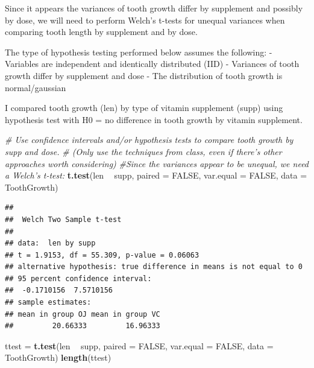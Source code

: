 \documentclass[]{article}
\newenvironment{Shaded}{\begin{snugshade}}{\end{snugshade}}
\newcommand{\KeywordTok}[1]{\textcolor[rgb]{0.13,0.29,0.53}{\textbf{#1}}}
\newcommand{\DataTypeTok}[1]{\textcolor[rgb]{0.13,0.29,0.53}{#1}}
\newcommand{\StringTok}[1]{\textcolor[rgb]{0.31,0.60,0.02}{#1}}
\newcommand{\CommentTok}[1]{\textcolor[rgb]{0.56,0.35,0.01}{\textit{#1}}}
\newcommand{\OtherTok}[1]{\textcolor[rgb]{0.56,0.35,0.01}{#1}}
\newcommand{\OperatorTok}[1]{\textcolor[rgb]{0.81,0.36,0.00}{\textbf{#1}}}
\newcommand{\NormalTok}[1]{#1}
\begin{document}
Since it appears the variances of tooth growth differ by supplement and
possibly by dose, we will need to perform Welch's t-tests for unequal
variances when comparing tooth length by supplement and by dose.

The type of hypothesis testing performed below assumes the following: -
Variables are independent and identically distributed (IID) - Variances
of tooth growth differ by supplement and dose - The distribution of
tooth growth is normal/gaussian

I compared tooth growth (len) by type of vitamin supplement (supp) using
hypothesis test with H0 = no difference in tooth growth by vitamin
supplement.

\begin{Shaded}
\begin{Highlighting}[]
\CommentTok{# Use confidence intervals and/or hypothesis tests to compare tooth growth by supp and dose. }
\CommentTok{# (Only use the techniques from class, even if there's other approaches worth considering)}
        \CommentTok{#Since the variances appear to be unequal, we need a Welch's t-test:}
        \KeywordTok{t.test}\NormalTok{(len }\OperatorTok{~}\StringTok{ }\NormalTok{supp, }\DataTypeTok{paired =} \OtherTok{FALSE}\NormalTok{, }\DataTypeTok{var.equal =} \OtherTok{FALSE}\NormalTok{, }\DataTypeTok{data =}\NormalTok{ ToothGrowth)}
\end{Highlighting}
\end{Shaded}

\begin{verbatim}
## 
##  Welch Two Sample t-test
## 
## data:  len by supp
## t = 1.9153, df = 55.309, p-value = 0.06063
## alternative hypothesis: true difference in means is not equal to 0
## 95 percent confidence interval:
##  -0.1710156  7.5710156
## sample estimates:
## mean in group OJ mean in group VC 
##         20.66333         16.96333
\end{verbatim}

\begin{Shaded}
\begin{Highlighting}[]
\NormalTok{        ttest =}\StringTok{ }\KeywordTok{t.test}\NormalTok{(len }\OperatorTok{~}\StringTok{ }\NormalTok{supp, }\DataTypeTok{paired =} \OtherTok{FALSE}\NormalTok{, }\DataTypeTok{var.equal =} \OtherTok{FALSE}\NormalTok{, }\DataTypeTok{data =}\NormalTok{ ToothGrowth)}
        \KeywordTok{length}\NormalTok{(ttest)}
\end{Highlighting}
\end{Shaded}
\end{document}
